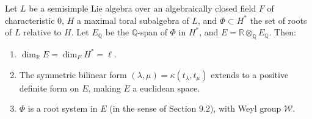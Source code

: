 Let $L$ be a semisimple Lie algebra over an algebraically closed field $F$ of characteristic $0$, $H$ a maximal toral subalgebra of $L$, and $\Phi \subset H^*$ the set of roots of $L$ relative to $H$. Let $E_{\mathbb{Q}}$ be the $\mathbb{Q}$-span of $\Phi$ in $H^*$, and $E = \mathbb{R} \otimes_{\mathbb{Q}} E_{\mathbb{Q}}$. Then:
\begin{enumerate}
\item[(a)] $\dim_{\mathbb{R}} E = \dim_F H^* = \ell$.
\item[(b)] The symmetric bilinear form $(\lambda, \mu) = \kappa(t_\lambda, t_\mu)$ extends to a positive definite form on $E$, making $E$ a euclidean space.
\item[(c)] $\Phi$ is a root system in $E$ (in the sense of Section 9.2), with Weyl group $\mathcal{W}$.
\end{enumerate}
